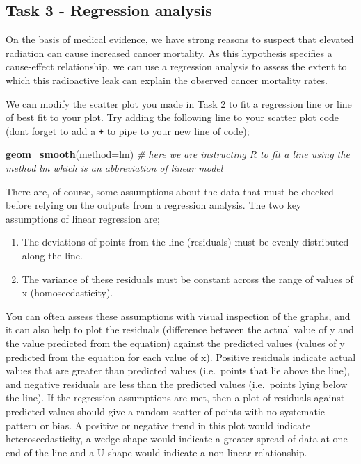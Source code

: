 \documentclass[
]{book}
\newenvironment{Shaded}{\begin{snugshade}}{\end{snugshade}}
\newcommand{\AttributeTok}[1]{\textcolor[rgb]{0.13,0.29,0.53}{#1}}
\newcommand{\CommentTok}[1]{\textcolor[rgb]{0.56,0.35,0.01}{\textit{#1}}}
\newcommand{\FunctionTok}[1]{\textcolor[rgb]{0.13,0.29,0.53}{\textbf{#1}}}
\newcommand{\NormalTok}[1]{#1}
\newcommand{\StringTok}[1]{\textcolor[rgb]{0.31,0.60,0.02}{#1}}
\providecommand{\tightlist}{%
  \setlength{\itemsep}{0pt}\setlength{\parskip}{0pt}}
\begin{document}
\hypertarget{c6t3}{%
\subsection{Task 3 - Regression analysis}\label{c6t3}}

On the basis of medical evidence, we have strong reasons to suspect that elevated radiation can cause increased cancer mortality. As this hypothesis specifies a cause-effect relationship, we can use a regression analysis to assess the extent to which this radioactive leak can explain the observed cancer mortality rates.

We can modify the scatter plot you made in Task 2 to fit a regression line or line of best fit to your plot. Try adding the following line to your scatter plot code (dont forget to add a \texttt{+} to pipe to your new line of code);

\begin{Shaded}
\begin{Highlighting}[]
 \FunctionTok{geom\_smooth}\NormalTok{(}\AttributeTok{method=}\StringTok{\textquotesingle{}lm\textquotesingle{}}\NormalTok{)}
\CommentTok{\# here we are instructing R to fit a line using the method \textasciigrave{}lm\textasciigrave{} which is an abbreviation of linear model}
\end{Highlighting}
\end{Shaded}

There are, of course, some assumptions about the data that must be checked before relying on the outputs from a regression analysis. The two key assumptions of linear regression are;

\begin{enumerate}
\def\labelenumi{\arabic{enumi})}
\tightlist
\item
  The deviations of points from the line (residuals) must be evenly distributed along the line.
\item
  The variance of these residuals must be constant across the range of values of x (homoscedasticity).
\end{enumerate}

You can often assess these assumptions with visual inspection of the graphs, and it can also help to plot the residuals (difference between the actual value of y and the value predicted from the equation) against the predicted values (values of y predicted from the equation for each value of x). Positive residuals indicate actual values that are greater than predicted values (i.e.~points that lie above the line), and negative residuals are less than the predicted values (i.e.~points lying below the line). If the regression assumptions are met, then a plot of residuals against predicted values should give a random scatter of points with no systematic pattern or bias. A positive or negative trend in this plot would indicate heteroscedasticity, a wedge-shape would indicate a greater spread of data at one end of the line and a U-shape would indicate a non-linear relationship.
\end{document}
